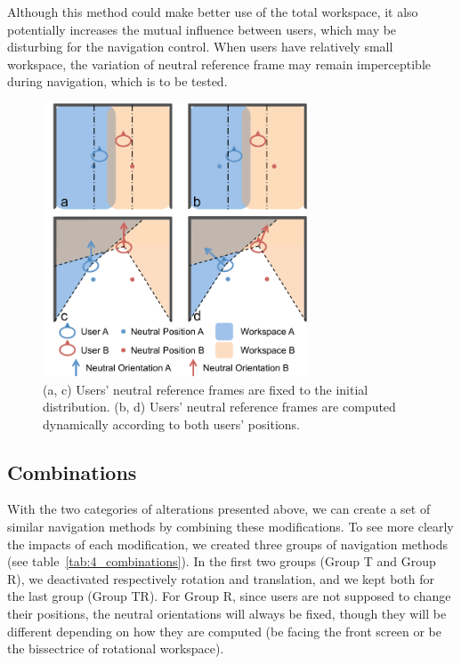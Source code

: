 Although this method could make better use of the total workspace, it also potentially increases the mutual influence between users, which may be disturbing for the navigation control. When users have relatively small workspace, the variation of neutral reference frame may remain imperceptible during navigation, which is to be tested.   

\begin{figure}[htb]
  \centering
  \includegraphics[width=0.7\textwidth]{figures/ch4/neutral_ref}
  \caption{\label{fig:4_neutral_ref}(a, c) Users' neutral reference frames are fixed to the initial distribution. (b, d) Users' neutral reference frames are computed dynamically according to both users' positions.}
\end{figure}

\subsection{Combinations}
With the two categories of alterations presented above, we can create a set of similar navigation methods by combining these modifications. To see more clearly the impacts of each modification, we created three groups of navigation methods (see table~\ref{tab:4_combinations}). In the first two groups (Group T and Group R), we deactivated respectively rotation and translation, and we kept both for the last group (Group TR). For Group R, since users are not supposed to change their positions, the neutral orientations will always be fixed, though they will be different depending on how they are computed (be facing the front screen or be the bissectrice of rotational workspace).


